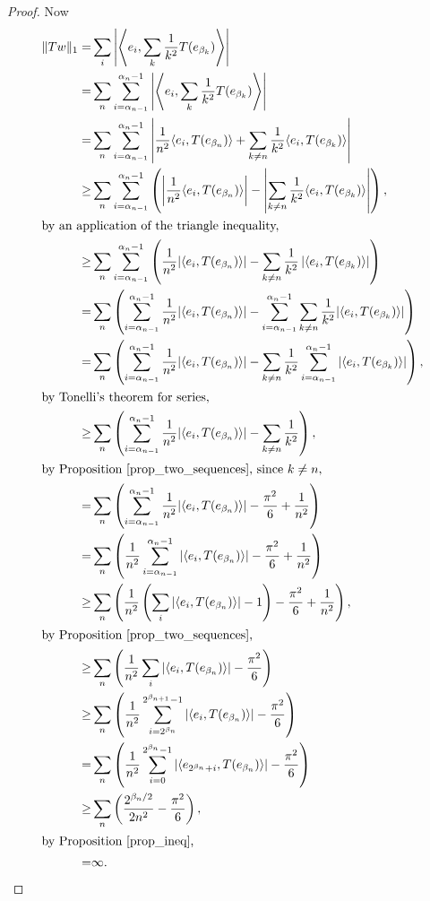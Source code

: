 \documentclass{dcthesis}
\numberwithin{equation}{section}
\numberwithin{equation}{section}
\theoremstyle{definition}
\begin{document}
\begin{proof}
	Now 
	\begin{align*}
		\|Tw\|_1
		=& \sum_i\left|\left\langle e_i,\sum_k\frac{1}{k^2}T(e_{\beta_k})\right\rangle \right| \\
		=& \sum_n \sum_{i=\alpha_{n-1}}^{\alpha_n-1}\left|\left\langle e_i,\sum_k\frac{1}{k^2}T(e_{\beta_k})\right\rangle \right| \\
		=& \sum_n \sum_{i=\alpha_{n-1}}^{\alpha_n-1} \left|\frac{1}{n^2}\langle e_i,T(e_{\beta_n})\rangle + \sum_{k\neq n}\frac{1}{k^2}\langle e_i,T(e_{\beta_k})\rangle \right| \\	
		\geq& \sum_n \sum_{i=\alpha_{n-1}}^{\alpha_n-1} \left(\left|\frac{1}{n^2}\langle e_i,T(e_{\beta_n})\rangle \right|-\left|\sum_{k\neq n}\frac{1}{k^2}\langle e_i,T(e_{\beta_k})\rangle \right|\right), \\
		\intertext{by an application of the triangle inequality,}
		\geq& \sum_n \sum_{i=\alpha_{n-1}}^{\alpha_n-1} \left(\frac{1}{n^2}|\langle e_i,T(e_{\beta_n})\rangle |-\sum_{k\neq n}\frac{1}{k^2}\left|\langle e_i,T(e_{\beta_k})\rangle \right|\right) \\
	=& \sum_n\left(\sum_{i=\alpha_{n-1}}^{\alpha_n-1}\frac{1}{n^2}|\langle e_i,T(e_{\beta_n})\rangle | - \sum_{i=\alpha_{n-1}}^{\alpha_n-1}\sum_{k\neq n}\frac{1}{k^2}|\langle e_i,T(e_{\beta_k})\rangle |\right) \\
		=& \sum_n\left(\sum_{i=\alpha_{n-1}}^{\alpha_n-1}\frac{1}{n^2}|\langle e_i,T(e_{\beta_n})\rangle | - \sum_{k\neq n}\frac{1}{k^2}\sum_{i=\alpha_{n-1}}^{\alpha_n-1}|\langle e_i,T(e_{\beta_k})\rangle |\right), \\
		\intertext{by Tonelli's theorem for series,}
		\geq& \sum_n\left(\sum_{i=\alpha_{n-1}}^{\alpha_n-1}\frac{1}{n^2}|\langle e_i,T(e_{\beta_n})\rangle | - \sum_{k\neq n}\frac{1}{k^2}\right), \\
		\intertext{by Proposition \ref{prop_two_sequences}, since $k\neq n$,}
		=& \sum_n\left(\sum_{i=\alpha_{n-1}}^{\alpha_n-1}\frac{1}{n^2}|\langle e_i,T(e_{\beta_n})\rangle | - \frac{\pi^2}{6} + \frac{1}{n^2}\right) \\
		=& \sum_n\left(\frac{1}{n^2}\sum_{i=\alpha_{n-1}}^{\alpha_n-1}|\langle e_i,T(e_{\beta_n})\rangle | - \frac{\pi^2}{6} + \frac{1}{n^2}\right) \\
		\geq& \sum_n\left(\frac{1}{n^2}\left(\sum_{i}|\langle e_i,T(e_{\beta_n})\rangle | - 1\right) - \frac{\pi^2}{6} + \frac{1}{n^2}\right), \\
		\intertext{by Proposition \ref{prop_two_sequences},}
		\geq& \sum_n\left(\frac{1}{n^2}\sum_{i}|\langle e_i,T(e_{\beta_n})\rangle | - \frac{\pi^2}{6}\right) \\
		\geq& \sum_n\left(\frac{1}{n^2}\sum_{i=2^{\beta_n}}^{2^{\beta_{n+1}}-1}|\langle e_i,T(e_{\beta_n})\rangle | - \frac{\pi^2}{6}\right) \\
		=& \sum_n\left(\frac{1}{n^2}\sum_{i=0}^{2^{\beta_{n}}-1}|\langle e_{2^{\beta_n}+i},T(e_{\beta_n})\rangle | - \frac{\pi^2}{6}\right) \\
		\geq& \sum_n\left(\frac{2^{\beta_n/2}}{2n^2}-\frac{\pi^2}{6}\right), \\
		\intertext{by Proposition \ref{prop_ineq},}
		=& \infty.
	\end{align*}


\end{proof}
\end{document}
